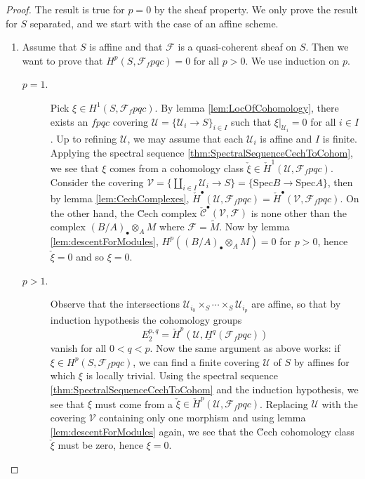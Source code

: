 \begin{proof}
The result is true for $p=0$ by the sheaf property. We only prove the result for $S$ separated, and we start with the case of an affine scheme.
\begin{enumerate}
\item
Assume that $S$ is affine and that $\mathcal{F}$ is a quasi-coherent sheaf on $S$. Then we want to prove that $H^p(S, \mathcal{F}_fpqc) = 0$ for all $p>0$. We use induction on $p$.
\begin{description}
\item[$p=1$.]
Pick $\xi \in H^1(S, \mathcal{F}_fpqc)$. By lemma \ref{lem:LocOfCohomology}, there exists an $fpqc$ covering $\mathcal{U} = \{ \mathcal{U}_i \to S \}_{i \in I}$ such that $\xi|_{\mathcal{U}_i} = 0$ for all $i \in I$. Up to refining $\mathcal{U}$, we may assume that each $\mathcal{U}_i$ is affine and $I$ is finite. Applying the spectral sequence \ref{thm:SpectralSequenceCechToCohom}, we see that $\xi$ comes from a cohomology class $\check{\xi} \in \check H^1(\mathcal{U}, \mathcal{F}_fpqc)$. Consider the covering $\mathcal{V} = \{ \coprod_{i\in I} \mathcal{U}_i \to S\} = \{ \text{Spec} B \to \text{Spec} A \}$, then by lemma \ref{lem:CechComplexes}, $\check H^\bullet(\mathcal{U}, \mathcal{F}_fpqc) = \check H^\bullet(\mathcal{V}, \mathcal{F}_fpqc)$. On the other hand, the \u Cech complex $\check{\mathcal{C}}^\bullet (\mathcal{V}, \mathcal{F})$ is none other than the complex $(B/A)_\bullet \otimes_A M$ where $\mathcal{F} = \widetilde{M}$. Now by lemma \ref{lem:descentForModules}, $H^p((B/A)_\bullet \otimes_A M) = 0$ for $p>0$, hence $\check{\xi} = 0$ and so $\xi = 0$.
\item[$p>1$.]
Observe that the intersections $\mathcal{U}_{i_0} \times_S \cdots \times_S \mathcal{U}_{i_p}$ are affine, so that by induction hypothesis the cohomology groups 
$$
E_2^{p,q} = \check H^p(\mathcal{U}, \underline{H}^q (\mathcal{F}_fpqc))
$$ 
vanish for all $0 < q < p$. Now the same argument as above works: if $\xi \in H^p(S, \mathcal{F}_fpqc)$, we can find a finite covering $\mathcal{U}$ of $S$ by affines for which $\xi$ is locally trivial. Using the spectral sequence \ref{thm:SpectralSequenceCechToCohom} and the induction hypothesis, we see that $\xi$ must come from a $\check{\xi} \in \check H^p(\mathcal{U}, \mathcal{F}_fpqc)$. Replacing $\mathcal{U}$ with the covering $\mathcal{V}$ containing only one morphism and using lemma \ref{lem:descentForModules} again, we see that the \u Cech cohomology class $\check{\xi}$ must be zero, hence $\xi = 0$.
\end{description}

\end{enumerate}
\end{proof}
